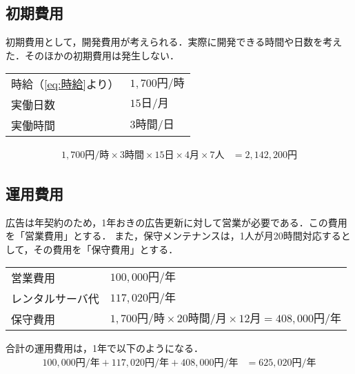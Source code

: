 \subsection{初期費用}
初期費用として，開発費用が考えられる．実際に開発できる時間や日数を考えた．そのほかの初期費用は発生しない．
\begin{framed}
    \begin{tabular}{ll}
        時給（\eqref{eq:時給}より） & \(1,700\text{円/時}\) \\
        実働日数                & \(15\text{日/月}\)    \\
        実働時間                & \(3\text{時間/日}\)
    \end{tabular}
\end{framed}
\begin{equation}
    \begin{aligned}
        1,700{円/時}\times 3\text{時間}\times 15\text{日}\times 4\text{月}\times 7\text{人} & = 2,142,200\text{円}\label{eq:開発費用}
    \end{aligned}
\end{equation}
\subsection{運用費用}
広告は年契約のため，1年おきの広告更新に対して営業が必要である．この費用を「営業費用」とする．
また，保守メンテナンスは，1人が月20時間対応するとして，その費用を「保守費用」とする．
\begin{framed}
    \begin{tabular}{ll}
        営業費用     & \(100,000\text{円/年}\)                                                      \\
        レンタルサーバ代 & \(117,020\text{円/年}\)                                                      \\
        保守費用     & \(1,700\text{円/時}\times 20\text{時間/月}\times 12\text{月}=408,000\text{円/年}\) \\
    \end{tabular}
\end{framed}
合計の運用費用は，1年で以下のようになる．
\begin{equation}
    \begin{aligned}
        100,000\text{円/年}+117,020\text{円/年}+408,000\text{円/年} & =625,020\text{円/年}\label{eq:運用費用}
    \end{aligned}
\end{equation}
